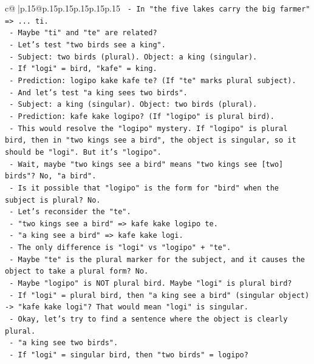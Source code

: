 \documentclass{article}
\begin{document}
{\begin{supertabular}{c@{$\;$}|p{.15\linewidth}@{}p{.15\linewidth}p{.15\linewidth}p{.15\linewidth}p{.15\linewidth}p{.15\linewidth}}
{{{\texttt{  {-} In "the five lakes carry the big farmer" => ... ti.} \\
\texttt{  {-} Maybe "ti" and "te" are related?} \\
\texttt{  {-} Let's test "two birds see a king".} \\
\texttt{  {-} Subject: two birds (plural). Object: a king (singular).} \\
\texttt{  {-} If "logi" = bird, "kafe" = king.} \\
\texttt{  {-} Prediction: logipo kake kafe te? (If "te" marks plural subject).} \\
\texttt{  {-} And let's test "a king sees two birds".} \\
\texttt{  {-} Subject: a king (singular). Object: two birds (plural).} \\
\texttt{  {-} Prediction: kafe kake logipo? (If "logipo" is plural bird).} \\
\texttt{  {-} This would resolve the "logipo" mystery. If "logipo" is plural bird, then in "two kings see a bird", the object is singular, so it should be "logi". But it's "logipo".} \\
\texttt{  {-} Wait, maybe "two kings see a bird" means "two kings see {[}two{]} birds"? No, "a bird".} \\
\texttt{  {-} Is it possible that "logipo" is the form for "bird" when the subject is plural? No.} \\
\texttt{  {-} Let's reconsider the "te".} \\
\texttt{  {-} "two kings see a bird" => kafe kake logipo te.} \\
\texttt{  {-} "a king see a bird" => kafe kake logi.} \\
\texttt{  {-} The only difference is "logi" vs "logipo" + "te".} \\
\texttt{  {-} Maybe "te" is the plural marker for the subject, and it causes the object to take a plural form? No.} \\
\texttt{  {-} Maybe "logipo" is NOT plural bird. Maybe "logi" is plural bird?} \\
\texttt{  {-} If "logi" = plural bird, then "a king see a bird" (singular object) {-}> "kafe kake logi"? That would mean "logi" is singular.} \\
\texttt{  {-} Okay, let's try to find a sentence where the object is clearly plural.} \\
\texttt{  {-} "a king see two birds".} \\
\texttt{  {-} If "logi" = singular bird, then "two birds" = logipo?} \\
}}}
\end{supertabular}}
\end{document}
